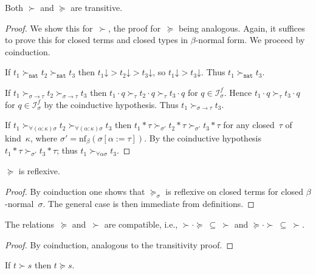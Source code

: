 \documentclass[a4paper,UKenglish,cleveref,autoref,numberwithinsect]{lipics-v2019}
\theoremstyle{definition}
\newcommand{\Iterms}{\mathcal{I}}
\newcommand{\arrtype}{\rightarrow}
\newcommand{\app}[2]{#1 \cdot #2}
\newcommand{\tapp}[2]{#1 * #2}
\newcommand{\subst}[2]{#1:=#2}
\newcommand{\nat}{\mathtt{nat}}
\newcommand{\nf}{\mathrm{nf}}
\newcommand{\da}{\mathord{\downarrow}}
\begin{document}
\begin{lemma}\label{lem_transitive}
  Both $\succ$ and $\succeq$ are transitive.
\end{lemma}

\begin{proof}
  We show this for~$\succ$, the proof for~$\succeq$ being
  analogous. Again, it suffices to prove this for closed terms and
  closed types in $\beta$-normal form. We proceed by coinduction.

  If $t_1 \succ_\nat t_2 \succ_\nat t_3$ then $t_1\da > t_2\da >
  t_3\da$, so $t_1\da > t_3\da$. Thus $t_1 \succ_\nat t_3$.

  If $t_1 \succ_{\sigma\arrtype\tau}t_2\succ_{\sigma\arrtype\tau}t_3$
  then $\app{t_1}{q}\succ_{\tau}\app{t_2}{q}\succ_\tau\app{t_3}{q}$
  for $q \in \Iterms^f_\sigma$. Hence
  $\app{t_1}{q}\succ_\tau\app{t_3}{q}$ for $q \in \Iterms^f_\sigma$ by
  the coinductive hypothesis. Thus $t_1\succ_{\sigma\arrtype\tau}
  t_3$.

  If $t_1
  \succ_{\forall(\alpha:\kappa)\sigma}t_2\succ_{\forall(\alpha:\kappa)\sigma}t_3$
  then
  $\tapp{t_1}{\tau}\succ_{\sigma'}\tapp{t_2}{\tau}\succ_{\sigma'}\tapp{t_3}{\tau}$
  for any closed~$\tau$ of kind~$\kappa$, where
  $\sigma' = \nf_\beta(\sigma[\subst{\alpha}{\tau}])$. By the
  coinductive hypothesis
  $\tapp{t_1}{\tau}\succ_{\sigma'}\tapp{t_3}{\tau}$; thus
  $t_1\succ_{\forall\alpha\sigma} t_3$.
\end{proof}

\begin{lemma}\label{lem_reflexive}
  $\succeq$ is reflexive.
\end{lemma}

\begin{proof}
  By coinduction one shows that $\succeq_\sigma$ is reflexive on
  closed terms for closed $\beta$-normal~$\sigma$. The general case is
  then immediate from definitions.
\end{proof}

\begin{lemma}\label{lem:compatibility}
  The relations~$\succeq$ and~$\succ$ are compatible, i.e., $\succ
  \cdot \succeq\ \subseteq\ \succ$ and $\succeq \cdot
  \succ\ \subseteq\ \succ$.
\end{lemma}

\begin{proof}
  By coinduction, analogous to the transitivity proof.
\end{proof}

\begin{lemma}\label{lem_succ_to_succeq}
  If $t \succ s$ then $t \succeq s$.
\end{lemma}
\end{document}
